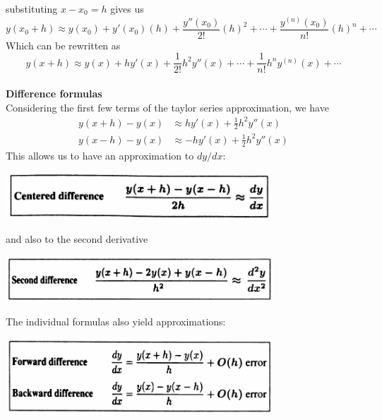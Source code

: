 \documentclass{report}
\begin{document}
substituting $x-x_0=h$ gives us
\begin{equation*}
y(x_0+h)\approx y(x_0)+y'(x_0)(h)+\frac{y''(x_0)}{2!}(h)^2+\cdots+\frac{y^{(n)}(x_0)}{n!}(h)^n+\cdots
\end{equation*}
Which can be rewritten as
\begin{equation*}
y(x+h)\approx y(x)+hy'(x)+\frac{1}{2!}h^2y''(x)+\cdots+\frac{1}{n!}h^ny^{(n)}(x)+\cdots
\end{equation*}
\vspace{1mm}\\
\textbf{Difference formulas}\\
Considering the first few terms of the taylor series approximation, we have
\begin{align*}
y(x+h)-y(x)&\approx hy'(x)+\frac{1}{2}h^2y''(x)\\
y(x-h)-y(x)&\approx-hy'(x)+\frac{1}{2}h^2y''(x)
\end{align*}
This allows us to have an approximation to $dy/dx$:
\begin{center}
\includegraphics[width=10cm]{22}
\end{center}
and also to the second derivative
\begin{center}
\includegraphics[width=10cm]{23}
\end{center}
The individual formulas also yield approximations:
\begin{center}
\includegraphics[width=10cm]{24}
\end{center}
\newpage
\end{document}

